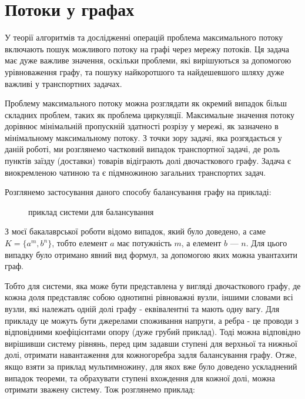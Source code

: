 \section{Потоки у графах}

У теорії алгоритмів та дослідженні операцій проблема максимального потоку включають пошук можливого потоку на графі через мережу потоків. Ця задача має дуже важливе значення, оскільки проблеми, які вирішуються за допомогою урівноваження графу, та пошуку найкоротшого та найдешевшого шляху дуже важливі у транспортних задачах.

Проблему максимального потоку можна розглядати як окремий випадок більш складних проблем, таких як проблема циркуляції. Максимальне значення потоку дорівнює мінімальній пропускній здатності розрізу у мережі, як зазначено в мінімальному максимальному потоку. З точки зору задачі, яка розгядається у даній роботі, ми розглянемо частковий випадок транспортної задачі, де роль пунктів  заїзду (доставки) товарів відіграють долі двочасткового графу. Задача є виокремленою чатиною та є підмножиною загальних транспортих задач.

Розглянемо застосування даного способу балансування графу на прикладі:

\begin{figure}[!htb]
\begin{center}
\end{center}
\caption{приклад системи для балансування}
\end{figure}

З моєї бакалаврської роботи відомо випадок, який було доведено, а саме $K=\{a^m,b^n\}$, тобто елемент $a$ має потужність $m$, а елемент $b$ --- $n$. Для цього випадку було отримано явний вид формул, за допомогою яких можна увантахити граф. 

Тобто для системи, яка може бути представлена у вигляді двочасткового графу, де кожна доля представляє собою однотипні рівноважні вузли, іншими словами всі вузли, які належать одній долі графу - еквівалентні та мають одну вагу. Для прикладу це можуть бути джерелами споживання напруги, а ребра - це проводи з відповідними коефіцієнтами опору (дуже грубий приклад). Тоді можна відповідно вирішивши систему рівнянь, перед цим задавши ступені для верхньої та нижньої долі, отримати навантаження для кожногоребра задля балансування графу. Отже, якщо взяти за приклад мультимножину, для якох вже було доведено ускладнений випадок теореми, та обрахувати ступені вхождення для кожної долі, можна отримати зважену систему. Тож розглянемо приклад:

